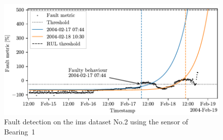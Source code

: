 \begin{figure}
    \centering
    \includegraphics{images/IMS/Test02/FD.pdf}
    \caption{Fault detection on the \gls{ims} dataset No.2 using the sensor of Bearing~1}
    \label{fig:IMS_n2_3x_fd}
\end{figure}

